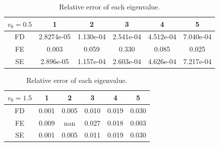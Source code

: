 \begin{table} [H]
	\centering
	\caption{Relative error of each eigenvalue.}
	\begin{tabular}{|c|c|c|c|c|c|}
		\hline
		$v_0=0.5$   & 1 & 2 & 3 & 4 & 5 \\
		\hline
		FD & 2.8274e-05 & 1.130e-04 & 2.541e-04 & 4.512e-04 & 7.040e-04 \\
		\hline
		FE & 0.003 & 0.059 & 0.330 & 0.085 & 0.025  \\
		\hline
		SE & 2.896e-05 & 1.157e-04 & 2.603e-04 & 4.626e-04 & 7.217e-04 \\
		\hline
	\end{tabular}
	\begin{tabular}{|c|c|c|c|c|c|}
		\hline
		$v_0=1.5$   & 1 & 2 & 3 & 4 & 5 \\
		\hline
		FD & 0.001 & 0.005 & 0.010 & 0.019 & 0.030 \\
		\hline
		FE & 0.009 & nan & 0.027 & 0.018 & 0.003  \\
		\hline
		SE & 0.001 & 0.005 & 0.011 & 0.019 & 0.030 \\
		\hline
	\end{tabular}
	\label{table:eigenvalue_error}
\end{table}

